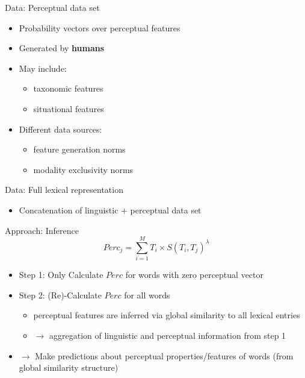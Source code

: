 \documentclass[12pt,a4paper]{beamer}
\begin{document}
\begin{frame}{Data: Perceptual data set}
\begin{itemize}
\item Probability vectors over perceptual features
\item Generated by \textbf{humans}
\item May include:
    \begin{itemize}
    \item taxonomic features
    \item situational features
    \end{itemize}
\item Different data sources:
    \begin{itemize}
    \item feature generation norms
    \item modality exclusivity norms
    \end{itemize}

\end{itemize}
\end{frame}

\begin{frame}{Data: Full lexical representation}
\begin{itemize}
\item Concatenation of linguistic + perceptual data set
\end{itemize}
\end{frame}


\begin{frame}{Approach: Inference}
$$ Perc_{j} = \sum_{i=1}^{M}{T_{i} \times S(T_{i}, T_{j})^{\lambda} } $$
\begin{itemize}
\item Step 1: Only Calculate $Perc$ for words with zero perceptual vector
\item Step 2: (Re)-Calculate $Perc$ for all words
    \begin{itemize}
    \item perceptual features are inferred via global similarity to all lexical entries
    \item $\to$ aggregation of linguistic and perceptual information from step 1
    \end{itemize}
\item $\to$ Make predictions about perceptual properties/features of words (from global similarity structure)
\end{itemize}
\end{frame}
\end{document}
